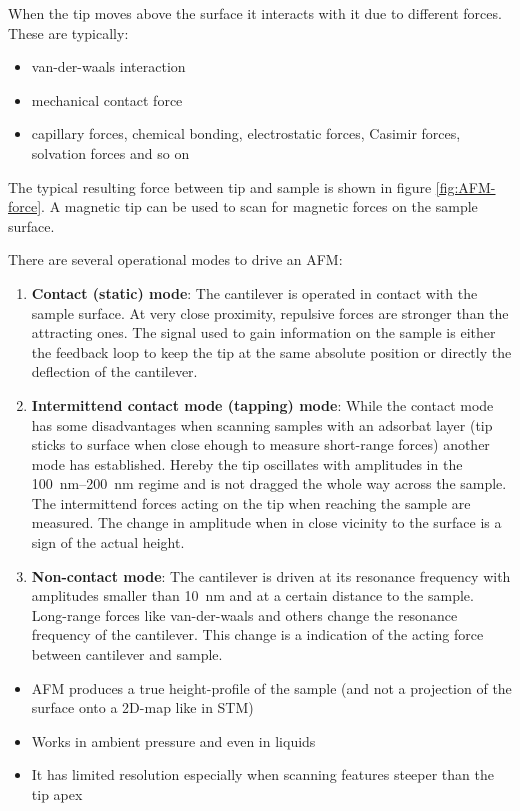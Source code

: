 When the tip moves above the surface it interacts with it due to different forces. These are typically:
\begin{itemize}
 \item van-der-waals interaction
 \item mechanical contact force
 \item capillary forces, chemical bonding, electrostatic forces, Casimir forces, solvation forces and so on
\end{itemize}

The typical resulting force between tip and sample is shown in figure \ref{fig:AFM-force}.
A magnetic tip can be used to scan for magnetic forces on the sample surface.

There are several operational modes to drive an AFM:
\begin{enumerate}
 \item \textbf{Contact (static) mode}: The cantilever is operated in contact with the sample surface. At very close proximity, repulsive forces are stronger than the attracting ones. The signal used to gain information on the sample is either the feedback loop to keep the tip at the same absolute position or directly the deflection of the cantilever.
 \item \textbf{Intermittend contact mode (tapping) mode}: While the contact mode has some disadvantages when scanning samples with an adsorbat layer (tip sticks to surface when close ehough to measure short-range forces) another mode has established. Hereby the tip oscillates with amplitudes in the \SIrange{100}{200}{\nm} regime and is not dragged the whole way across the sample. The intermittend forces acting on the tip when reaching the sample are measured. The change in amplitude when in close vicinity to the surface is a sign of the actual height.
 \item \textbf{Non-contact mode}: The cantilever is driven at its resonance frequency with amplitudes smaller than \SI{10}{\nm} and at a certain distance to the sample. Long-range forces like van-der-waals and others change the resonance frequency of the cantilever. This change is a indication of the acting force between cantilever and sample.
\end{enumerate}

\begin{itemize}
 \item AFM produces a true height-profile of the sample (and not a projection of the surface onto a 2D-map like in STM)
 \item Works in ambient pressure and even in liquids
 \item It has limited resolution especially when scanning features steeper than the tip apex
\end{itemize}

